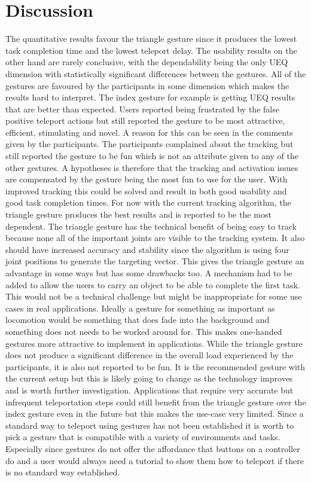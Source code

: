 \chapter{Discussion} %
\label{cha:Discussion}

The quantitative results favour the triangle gesture since it produces the lowest task completion time and the lowest teleport delay. The usability results on the other hand are rarely conclusive, with the dependability being the only UEQ dimension with statistically significant differences between the gestures. All of the gestures are favoured by the participants in some dimension which makes the results hard to interpret. The index gesture for example is getting UEQ results that are better than expected. Users reported being frustrated by the false positive teleport actions but still reported the gesture to be most attractive, efficient, stimulating and novel. A reason for this can be seen in the comments given by the participants. The participants complained about the tracking but still reported the gesture to be fun which is not an attribute given to any of the other gestures. A hypotheses is therefore that the tracking and activation issues are compensated by the gesture being the most fun to use for the user. With improved tracking this could be solved and result in both good usability and good task completion times. For now with the current tracking algorithm, the triangle gesture produces the best results and is reported to be the most dependent. The triangle gesture has the technical benefit of being easy to track because none all of the important joints are visible to the tracking system. It also should have increased accuracy and stability since the algorithm is using four joint positions to generate the targeting vector. This gives the triangle gesture an advantage in some ways but has some drawbacks too. A mechanism had to be added to allow the users to carry an object to be able to complete the first task. This would not be a technical challenge but might be inappropriate for some use cases in real applications. Ideally a gesture for something as important as locomotion would be something that does fade into the background and something does not needs to be worked around for. This makes one-handed gestures more attractive to implement in applications. While the triangle gesture does not produce a significant difference in the overall load experienced by the participants, it is also not reported to be fun. It is the recommended gesture with the current setup but this is likely going to change as the technology improves and is worth further investigation. Applications that require very accurate but infrequent teleportation steps could still benefit from the triangle gesture over the index gesture even in the future but this makes the use-case very limited. Since a standard way to teleport using gestures has not been established it is worth to pick a gesture that is compatible with a variety of environments and tasks. Especially since gestures do not offer the affordance that buttons on a controller do and a user would always need a tutorial to show them how to teleport if there is no standard way established. 



